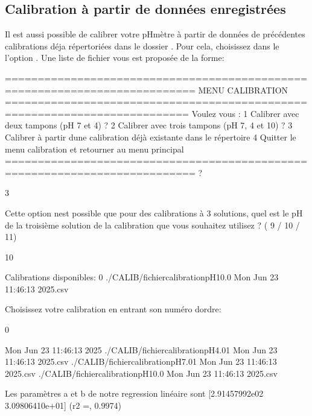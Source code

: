 \documentclass[letterpaper,10pt,french]{sphinxmanual}
\begin{document}
\subsection{Calibration à partir de données enregistrées}
\label{\detokenize{calib:calibration-a-partir-de-donnees-enregistrees}}
\sphinxAtStartPar
Il est aussi possible de calibrer votre pH\sphinxhyphen{}mètre à partir de données de précédentes calibrations déja répertoriées dans le dossier .
Pour cela, choisissez dans le  l’option .
Une liste de fichier vous est proposée de la forme:

\begin{sphinxVerbatim}[commandchars=\\\{\}]
===========================================================================
MENU CALIBRATION
==========================================================================
Voulez \PYGZhy{} vous :
1 \PYGZhy{} Calibrer avec deux tampons (pH 7 et 4) ?
2 \PYGZhy{} Calibrer avec trois tampons (pH 7, 4 et 10) ?
3 \PYGZhy{} Calibrer à partir d\PYGZsq{}une calibration déjà existante dans le répertoire
4 \PYGZhy{} Quitter le menu calibration et retourner au menu principal
===========================================================================
?

\PYGZhy{}\PYGZgt{} 3

Cette option n\PYGZsq{}est possible que pour des calibrations à 3 solutions, quel est le pH de la troisième solution de la calibration que vous souhaitez utilisez ? ( 9 / 10 / 11)

\PYGZhy{}\PYGZgt{} 10

Calibrations disponibles:
0 \PYGZhy{} ./CALIB/fichier\PYGZus{}calibration\PYGZus{}pH10.0 Mon Jun 23 11:46:13 2025.csv

Choisissez votre calibration en entrant son numéro d\PYGZsq{}ordre:

\PYGZhy{}\PYGZgt{} 0

Mon Jun 23 11:46:13 2025
./CALIB/fichier\PYGZus{}calibration\PYGZus{}pH4.01 Mon Jun 23 11:46:13 2025.csv
./CALIB/fichier\PYGZus{}calibration\PYGZus{}pH7.01 Mon Jun 23 11:46:13 2025.csv
./CALIB/fichier\PYGZus{}calibration\PYGZus{}pH10.0 Mon Jun 23 11:46:13 2025.csv

Les paramètres a et b de notre regression linéaire sont [\PYGZhy{}2.91457992e\PYGZhy{}02  3.09806410e+01]
(\PYGZsq{}r2 =\PYGZsq{}, 0.9974)
\end{sphinxVerbatim}
\end{document}

